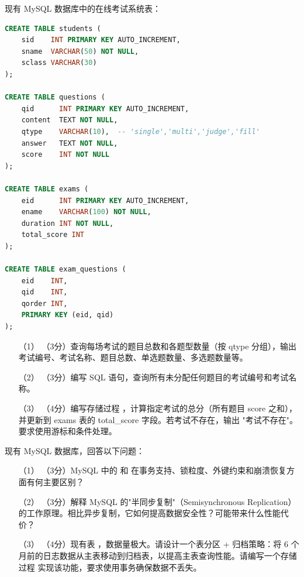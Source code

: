 \documentclass[a4paper,11pt]{article}
\begin{document}
\q 现有 MySQL 数据库中的在线考试系统表：
\begin{lstlisting}[language=SQL]
CREATE TABLE students (
    sid    INT PRIMARY KEY AUTO_INCREMENT,
    sname  VARCHAR(50) NOT NULL,
    sclass VARCHAR(30)
);

CREATE TABLE questions (
    qid      INT PRIMARY KEY AUTO_INCREMENT,
    content  TEXT NOT NULL,
    qtype    VARCHAR(10),  -- 'single','multi','judge','fill'
    answer   TEXT NOT NULL,
    score    INT NOT NULL
);

CREATE TABLE exams (
    eid      INT PRIMARY KEY AUTO_INCREMENT,
    ename    VARCHAR(100) NOT NULL,
    duration INT NOT NULL,
    total_score INT
);

CREATE TABLE exam_questions (
    eid    INT,
    qid    INT,
    qorder INT,
    PRIMARY KEY (eid, qid)
);
\end{lstlisting}
\begin{enumerate}[leftmargin=2em, itemsep=3pt]
  \item[（1）] （3分）查询每场考试的题目总数和各题型数量（按 qtype 分组），输出考试编号、考试名称、题目总数、单选题数量、多选题数量等。
  \item[（2）] （3分）编写 SQL 语句，查询所有未分配任何题目的考试编号和考试名称。
  \item[（3）] （4分）编写存储过程 ，计算指定考试的总分（所有题目 score 之和），并更新到 exams 表的 total_score 字段。若考试不存在，输出 "考试不存在"。要求使用游标和条件处理。
\end{enumerate}
\anslines{3.5cm}

\q 现有 MySQL 数据库，回答以下问题：
\begin{enumerate}[leftmargin=2em, itemsep=3pt]
  \item[（1）] （3分）MySQL 中的  和  在事务支持、锁粒度、外键约束和崩溃恢复方面有何主要区别？
  \item[（2）] （3分）解释 MySQL 的"半同步复制"（Semisynchronous Replication）的工作原理。相比异步复制，它如何提高数据安全性？可能带来什么性能代价？
  \item[（3）] （4分）现有表 ，数据量极大。请设计一个表分区 + 归档策略：将 6 个月前的日志数据从主表移动到归档表，以提高主表查询性能。请编写一个存储过程  实现该功能，要求使用事务确保数据不丢失。
\end{enumerate}
\anslines{3.5cm}
\end{document}
